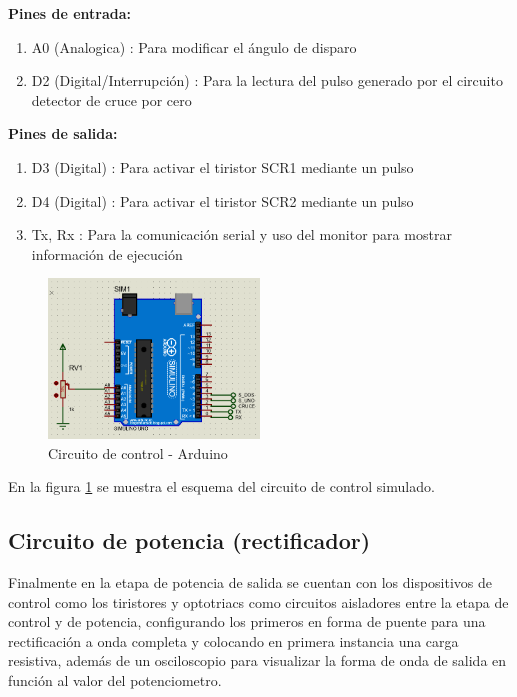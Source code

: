 \documentclass[conference]{IEEEtran}
\begin{document}
	\textbf{Pines de entrada:} \\
	\begin{enumerate}
		\item A0 (Analogica) : Para modificar el ángulo de disparo
		\item D2 (Digital/Interrupción) : Para la lectura del pulso generado por el circuito detector de cruce por cero
	\end{enumerate}
	
	\textbf{Pines de salida:}\\
	\begin{enumerate}
		\item D3 (Digital) : Para activar el tiristor SCR1 mediante un pulso
		\item D4 (Digital) : Para activar el tiristor SCR2 mediante un pulso
		\item Tx, Rx : Para la comunicación serial y uso del monitor para mostrar información de ejecución 		
	\end{enumerate}
	
	\begin{figure}[h]
		\centering
		\includegraphics[width=0.5\textwidth]{media/circuito-control}
		\caption{Circuito de control - Arduino}
		\label{fig:circuito-control}
	\end{figure}
	
	En la figura \ref{fig:circuito-control} se muestra el esquema del circuito de control simulado.
	
	\subsection{\textbf{Circuito de potencia (rectificador)}}
	
	Finalmente en la etapa de potencia de salida se cuentan con los dispositivos de control como los tiristores y optotriacs como circuitos aisladores entre la etapa de control y de potencia, configurando los primeros en forma de puente para una rectificación a onda completa y colocando en primera instancia una carga resistiva, además de un osciloscopio para visualizar la forma de onda de salida en función al valor del potenciometro.
	
\end{document}
